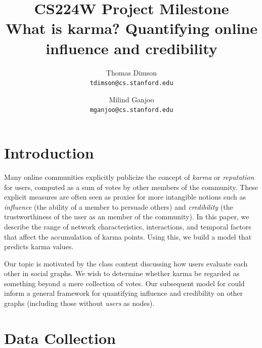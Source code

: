 \documentclass[10pt]{article}
\title{{\large CS224W Project Milestone} \\
  What is karma? Quantifying online influence and credibility
}
\author{Thomas Dimson \\ {\tt tdimson@cs.stanford.edu}
  \and
  Milind Ganjoo \\ {\tt mganjoo@cs.stanford.edu}
}
\date{}
\begin{document}
\maketitle


\section{Introduction}
Many online communities explicitly publicize the concept of \textit{karma} or
\textit{reputation} for users, computed as a sum of votes by other members of
the community. These explicit measures are often seen as proxies for more
intangible notions such as \textit{influence} (the ability of a member to
persuade others) and \textit{credibility} (the trustworthiness of the user as an
member of the community). In this paper, we describe the range of network
characteristics, interactions, and temporal factors that affect the accumulation
of karma points. Using this, we build a model that predicts karma values.

Our topic is motivated by the class content discussing how users evaluate
each other in social graphs. We wish to determine whether karma be regarded
as something beyond a mere collection of votes. Our subsequent model for 
could inform a general framework for quantifying influence and credibility
on other graphs (including those without \textit{users} as nodes).

\section*{Data Collection}
\end{document}
